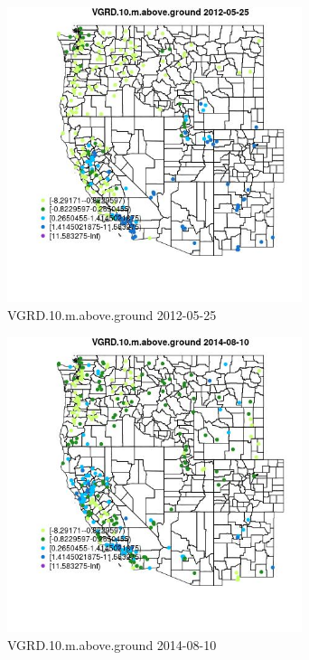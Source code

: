 \begin{figure} 
\centering  
\includegraphics[width=0.77\textwidth]{Code_Outputs/Report_ML_input_PM25_Step4_part_e_de_duplicated_aves_compiled_2019-05-18wNAs_MapObsVGRD10maboveground2012-05-25.jpg} 
\caption{\label{fig:Report_ML_input_PM25_Step4_part_e_de_duplicated_aves_compiled_2019-05-18wNAsMapObsVGRD10maboveground2012-05-25}VGRD.10.m.above.ground 2012-05-25} 
\end{figure} 
 

\begin{figure} 
\centering  
\includegraphics[width=0.77\textwidth]{Code_Outputs/Report_ML_input_PM25_Step4_part_e_de_duplicated_aves_compiled_2019-05-18wNAs_MapObsVGRD10maboveground2014-08-10.jpg} 
\caption{\label{fig:Report_ML_input_PM25_Step4_part_e_de_duplicated_aves_compiled_2019-05-18wNAsMapObsVGRD10maboveground2014-08-10}VGRD.10.m.above.ground 2014-08-10} 
\end{figure} 
 

